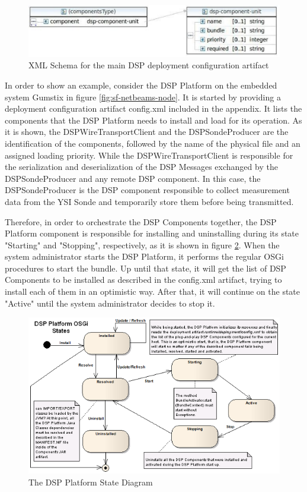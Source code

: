 \begin{figure}[h]
  \centering
  \includegraphics[scale=0.8]{../diagrams/config-schema}
  \caption{XML Schema for the main DSP deployment configuration artifact}
  \label{fig:dsp-config-schema}
\end{figure}

In order to show an example, consider the DSP Platform on the embedded system
Gumstix in figure \ref{fig:sf-netbeams-node}. It is started by providing a
deployment configuration artifact config.xml included in the appendix. It lists
the components that the DSP Platform needs to install and load for its
operation. As it is shown, the DSPWireTransportClient and the DSPSondeProducer
are the identification of the components, followed by the name of the physical
file and an assigned loading priority. While the DSPWireTransportClient is
responsible for the serialization and deserialization of the DSP Messages
exchanged by the DSPSondeProducer and any remote DSP component. In this case,
the DSPSondeProducer is the DSP component responsible to collect measurement
data from the YSI Sonde and temporarily store them before being transmitted.

Therefore, in order to orchestrate the DSP Components together, the DSP
Platform component is responsible for installing and uninstalling during its
state "Starting" and "Stopping", respectively, as it is shown in figure
\ref{fig:DSPPlatform-Install-Usage-State-Diagram}. When the system
administrator starts the DSP Platform, it performs the regular OSGi procedures
to start the bundle. Up until that state, it will get the list of DSP
Components to be installed as described in the config.xml artifact, trying to
install each of them in an optimistic way. After that, it will continue on the
state "Active" until the system administrator decides to stop it.

\begin{figure}[!b]
  \centering
  \includegraphics[scale=0.6]{../diagrams/DSPPlatform-Install-Usage-State-Diagram}
  \caption{The DSP Platform State Diagram}
  \label{fig:DSPPlatform-Install-Usage-State-Diagram}
\end{figure}

